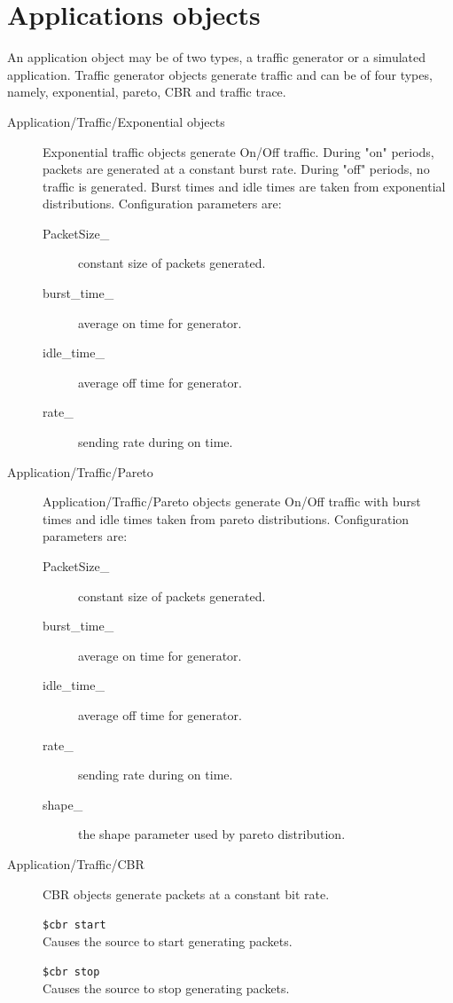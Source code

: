 \section{Applications objects} 
\label{sec:appobjects} 
An application object may be of two types, a traffic generator or a
simulated application. Traffic generator objects generate traffic and can
be of four types, namely, exponential, pareto, CBR and traffic trace. 
\begin{description} 
\item[Application/Traffic/Exponential objects]
Exponential traffic objects generate On/Off traffic. During "on" periods,
packets are generated at a constant burst rate. During "off" periods, no
traffic is generated. Burst times and idle times are taken from
exponential distributions. Configuration parameters are:  
\begin{description} 
\item[PacketSize\_] constant size of packets generated.
\item[burst\_time\_] average on time for generator. 
\item[idle\_time\_] average off time for generator.  
\item[rate\_] sending rate during on time.  
\end{description}

\item[Application/Traffic/Pareto] 
Application/Traffic/Pareto objects generate On/Off traffic with burst
times and idle times taken from pareto distributions. Configuration
parameters are:
\begin{description}
\item[PacketSize\_] constant size of packets generated.
\item[burst\_time\_] average on time for generator.
\item[idle\_time\_] average off time for generator.
\item[rate\_] sending rate during on time.
\item[shape\_] the shape parameter used by pareto distribution.
\end{description}

\item[Application/Traffic/CBR]
CBR objects generate packets at a constant bit rate. 

{\tt \$cbr start}\\
Causes the source to start generating packets. 

{\tt \$cbr stop}\\
Causes the source to stop generating packets. 


\end{description}
